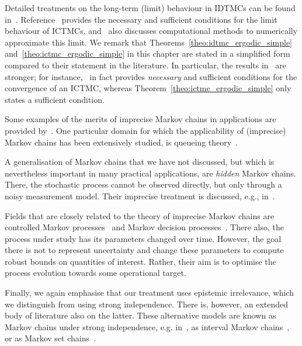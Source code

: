\documentclass[graybox]{svmult}
\begin{document}
Detailed treatments on the long-term (limit) behaviour in IDTMCs can be found in~\cite{decooman:2009, hermans:2012, skulv:2013, decooman:2015}. Reference~\cite{DeBock:2016} provides the necessary and sufficient conditions for the limit behaviour of ICTMCs, and~\cite{erreygers2017imprecise} also discusses computational methods to numerically approximate this limit. We remark that Theorems~\ref{theo:idtmc_ergodic_simple} and~\ref{theo:ictmc_ergodic_simple} in this chapter are stated in a simplified form compared to their statement in the literature. In particular, the results in~\cite{decooman:2009,DeBock:2016} are stronger; for instance,~\cite{DeBock:2016} in fact provides \emph{necessary} and sufficient conditions for the convergence of an ICTMC, whereas Theorem~\ref{theo:ictmc_ergodic_simple} only states a sufficient condition.

Some examples of the merits of imprecise Markov chains in applications are provided by~\cite{soullard2017, troffaes2015using, rottondi:2017}. One particular domain for which the applicability of (imprecise) Markov chains has been extensively studied, is queueing theory~\cite{crossman:2009, lopatatzidis:2015b:isipta, lopatatzidis:2015:isipta, lopatatzidis2016queue, lopatatzidis:2017:journal}.

A generalisation of Markov chains that we have not discussed, but which is nevertheless important in many practical applications, are \emph{hidden} Markov chains. There, the stochastic process cannot be observed directly, but only through a noisy measurement model. Their imprecise treatment is discussed, e.g., in~\cite{benavoli2011,DeBock:2014ts,krak2017icthmc}.

Fields that are closely related to the theory of imprecise Markov chains are controlled Markov processes~\cite{guo:2003} and Markov decision processes~\cite{satia:1973, white:1994, itoh:2007, guo:2009}. There also, the process under study has its parameters changed over time. However, the goal there is not to represent uncertainty and change these parameters to compute robust bounds on quantities of interest. Rather, their aim is to optimise the process evolution towards some operational target.

Finally, we again emphasise that our treatment uses epistemic irrelevance, which we distinguish from using strong independence. There is, however, an extended body of literature also on the latter. These alternative models are known as Markov chains under strong independence, e.g. in~\cite{augustin2013:itip}, as interval Markov chains~\cite{kozine:2002, skulj:2006, skulj:2007, galdino:2013}, or as Markov set chains~\cite{hartfiel:1991, hartfiel:1994, hartfiel:1998}.


\end{document}
